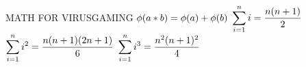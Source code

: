 \documentclass[12pt]{article}
\begin{document}
MATH FOR VIRUSGAMING 
$\newline\phi(a*b) = \phi(a)+\phi(b)\newline$
$\displaystyle\sum_{i = 1}^{n} i = \frac{n(n+1)}{2}\newline$
$\displaystyle\sum_{i = 1}^{n} i^{2} = \frac{n(n+1)(2n+1)}{6}\newline$
$\displaystyle\sum_{i = 1}^{n} i^{3} = \frac{n^2(n+1)^2}{4}\newline$
\end{document}
